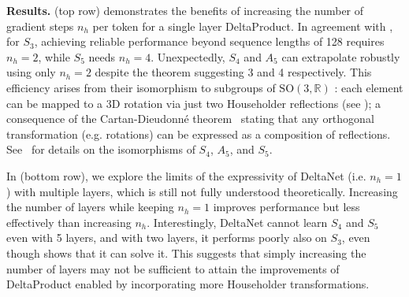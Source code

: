 \documentclass{article} %
\begin{document}
\textbf{Results.}  (top row) demonstrates the benefits of increasing the number of gradient steps \(n_h\) per token for a single layer DeltaProduct. In agreement with \citet[Theorem 3]{grazzi-iclr25a}, for \(S_3\), achieving reliable performance beyond sequence lengths of 128 requires \(n_h=2\), while \(S_5\) needs \(n_h=4\). Unexpectedly, \(S_4\) and \(A_5\) can extrapolate robustly using only \(n_h=2\) despite the theorem suggesting 3 and 4 respectively. This efficiency arises from their isomorphism to subgroups of \(\mathrm{SO}(3,\mathbb{R})\) \citep[Ch. 1, Sec. 2.4]{schwarzbach2010groups}: each element can be mapped to a 3D rotation via just two Householder reflections (see ); a consequence of the Cartan-Dieudonné theorem~\citep{springer_cartan} stating that any orthogonal transformation (e.g. rotations) can be expressed as a composition of reflections. See~ for details on the isomorphisms of $S_4$, $A_5$, and $S_5$. 

In  (bottom row), we explore the limits of the expressivity of DeltaNet (i.e. $n_h=1$) with multiple layers, which is still not fully understood theoretically. Increasing the number of layers while keeping $n_h=1$ improves performance but less effectively than increasing $n_h$. Interestingly, DeltaNet cannot learn $S_4$ and $S_5$ even with 5 layers, and with two layers, it performs poorly also on $S_3$, even though  shows that it can solve it. This suggests that simply increasing the number of layers may not be sufficient to attain the improvements of DeltaProduct enabled by incorporating more Householder transformations.
\end{document}
